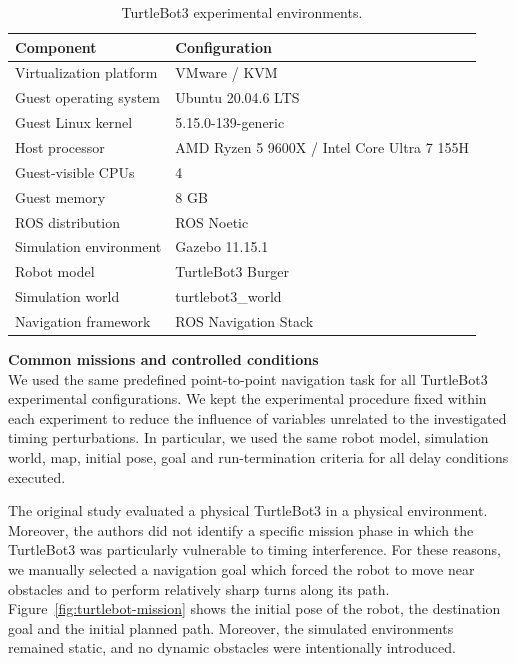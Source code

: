 \begin{table}[t]
    \centering
    \caption{TurtleBot3 experimental environments.}
    \label{tab:turtlebot-env}
    \small
    \begin{tabular}{ll}
        \toprule
        Component & Configuration \\
        \midrule
        Virtualization platform
            & VMware / KVM \\

        Guest operating system
            & Ubuntu 20.04.6 LTS \\

        Guest Linux kernel
            & 5.15.0-139-generic \\

        Host processor
            & AMD Ryzen 5 9600X / Intel Core Ultra 7 155H \\

        Guest-visible CPUs
            & 4 \\

        Guest memory
            & 8 GB \\

        ROS distribution
            & ROS Noetic \\

        Simulation environment
            & Gazebo 11.15.1 \\

        Robot model
            & TurtleBot3 Burger \\

        Simulation world
            & turtlebot3\_world \\

        Navigation framework
            & ROS Navigation Stack \\
        \bottomrule
    \end{tabular}
\end{table}

\noindent \textbf{Common missions and controlled conditions} \label{sec:2.2.1} \\
We used the same predefined point-to-point navigation task for all TurtleBot3 experimental configurations. We kept the experimental procedure fixed within each experiment to reduce the influence of variables unrelated to the investigated timing perturbations. In particular, we used the same robot model, simulation world, map, initial pose, goal and run-termination criteria for all delay conditions executed.

\noindent The original study evaluated a physical TurtleBot3 in a physical environment. Moreover, the authors did not identify a specific mission phase in which the TurtleBot3 was particularly vulnerable to timing interference. For these reasons, we manually selected a navigation goal which forced the robot to move near obstacles and to perform relatively sharp turns along its path. Figure~\ref{fig:turtlebot-mission} shows the initial pose of the robot, the destination goal and the initial planned path. Moreover, the simulated environments remained static, and no dynamic obstacles were intentionally introduced. 

